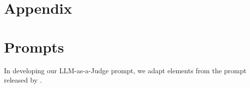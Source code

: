 \newpage
\appendix

\section*{\center\LARGE Appendix}

\vspace{4mm}

\section{Prompts}
\label{appendix:llm_judge}
In developing our LLM-as-a-Judge prompt, we adapt elements from the prompt released by \cite{packer2023memgpt}.


